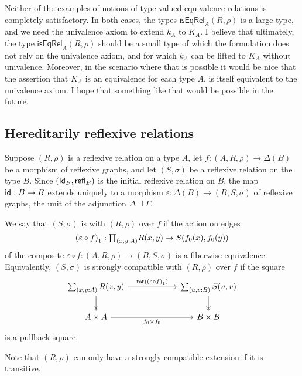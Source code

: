 \documentclass[reqno]{amsart}
\begin{document}
Neither of the examples of notions of type-valued equivalence relations is completely satisfactory. In both cases, the types $\mathsf{isEqRel}_A(R,\rho)$ is a large type, and we need the univalence axiom to extend $k_A$ to $K_A$. I believe that ultimately, the type $\mathsf{isEqRel}_A(R,\rho)$ should be a small type of which the formulation does not rely on the univalence axiom, and for which $k_A$ can be lifted to $K_A$ without univalence. Moreover, in the scenario where that is possible it would be nice that the assertion that $K_A$ is an equivalence for each type $A$, is itself equivalent to the univalence axiom. I hope that something like that would be possible in the future.

\subsection{Hereditarily reflexive relations}\label{sec:hrr}
Suppose $(R,\rho)$ is a reflexive relation on a type $A$, let $f:(A,R,\rho)\to\Delta(B)$
be a morphism of reflexive graphs, and let $(S,\sigma)$ be a reflexive relation
on the type $B$. Since $(\mathsf{Id}_{B},\mathsf{refl}_{B})$ is the initial reflexive relation
on $B$, the map $\mathsf{id}_{}:B\to B$ extends uniquely to a morphism $\varepsilon:\Delta(B)\to (B,S,\sigma)$
of reflexive graphs, the unit of the adjunction $\Delta\dashv \Gamma$. 

We say that $(S,\sigma)$ is  with $(R,\rho)$ over $f$
if the action on edges 
\begin{equation*}
\edg{(\varepsilon\circ f)} : \prd{x,y:A} R(x,y)\to S(\pts{f}(x),\pts{f}(y))
\end{equation*}
of the composite $\varepsilon\circ f:(A,R,\rho)\to (B,S,\sigma)$
is a fiberwise equivalence. Equivalently, $(S,\sigma)$ is strongly compatible with
$(R,\rho)$ over $f$ if the square
\begin{equation*}
\begin{tikzcd}[column sep=6em]
\sm{x,y:A}R(x,y) \arrow[d,->>] \arrow[r,"\total{\edg{(\varepsilon\circ f)}}"] & \sm{u,v:B} S(u,v) \arrow[d,->>] \\
A\times A \arrow[r,swap,"\pts{f}\times\pts{f}"] & B\times B
\end{tikzcd}
\end{equation*}
is a pullback square.

Note that $(R,\rho)$ can only have a strongly compatible extension if it is
transitive.
\end{document}
